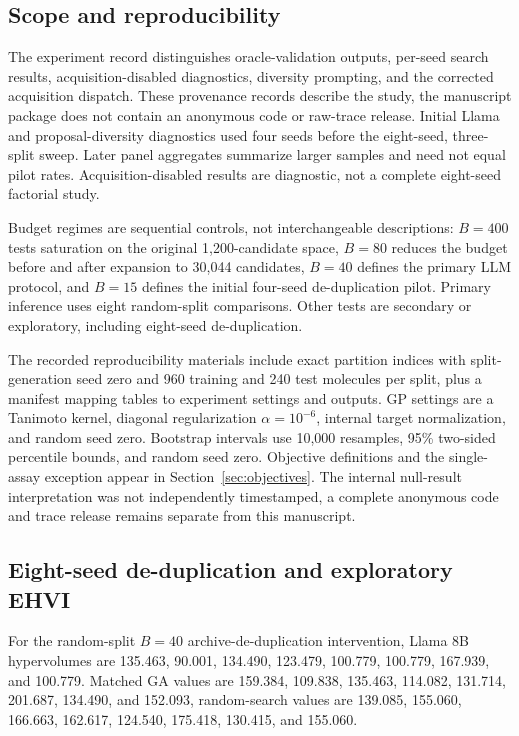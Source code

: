\subsection{Scope and reproducibility}
The experiment record distinguishes oracle-validation outputs, per-seed search results, acquisition-disabled diagnostics, diversity prompting, and the corrected acquisition dispatch. These provenance records describe the study, the manuscript package does not contain an anonymous code or raw-trace release. Initial Llama and proposal-diversity diagnostics used four seeds before the eight-seed, three-split sweep. Later panel aggregates summarize larger samples and need not equal pilot rates. Acquisition-disabled results are diagnostic, not a complete eight-seed factorial study.

Budget regimes are sequential controls, not interchangeable descriptions: $B=400$ tests saturation on the original 1,200-candidate space, $B=80$ reduces the budget before and after expansion to 30,044 candidates, $B=40$ defines the primary LLM protocol, and $B=15$ defines the initial four-seed de-duplication pilot. Primary inference uses eight random-split comparisons. Other tests are secondary or exploratory, including eight-seed de-duplication.

The recorded reproducibility materials include exact partition indices with split-generation seed zero and 960 training and 240 test molecules per split, plus a manifest mapping tables to experiment settings and outputs. GP settings are a Tanimoto kernel, diagonal regularization $\alpha=10^{-6}$, internal target normalization, and random seed zero. Bootstrap intervals use 10,000 resamples, 95\% two-sided percentile bounds, and random seed zero. Objective definitions and the single-assay exception appear in Section~\ref{sec:objectives}. The internal null-result interpretation was not independently timestamped, a complete anonymous code and trace release remains separate from this manuscript.

\subsection{Eight-seed de-duplication and exploratory EHVI}
\label{app:dedup-full8}
For the random-split $B=40$ archive-de-duplication intervention, Llama 8B hypervolumes are 135.463, 90.001, 134.490, 123.479, 100.779, 100.779, 167.939, and 100.779. Matched GA values are 159.384, 109.838, 135.463, 114.082, 131.714, 201.687, 134.490, and 152.093, random-search values are 139.085, 155.060, 166.663, 162.617, 124.540, 175.418, 130.415, and 155.060.

